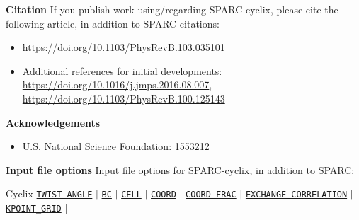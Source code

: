 \begin{frame}[allowframebreaks]{\textbf{Citation}} \label{Citation}
If you publish work using/regarding SPARC-cyclix, please cite the following article, in addition to SPARC citations:
\begin{itemize}
    \item \url{https://doi.org/10.1103/PhysRevB.103.035101}
    \item Additional references for initial developments: \url{https://doi.org/10.1016/j.jmps.2016.08.007}, \url{https://doi.org/10.1103/PhysRevB.100.125143}
\end{itemize}
\end{frame}


\begin{frame}[allowframebreaks]{\textbf{Acknowledgements}} \label{Acknowledgements}
\begin{itemize}
    \item U.S. National Science Foundation: 1553212
\end{itemize}
\end{frame}


\begin{frame}[allowframebreaks]{\textbf{Input file options}} \label{Index}
\vspace{-2mm}
Input file options for SPARC-cyclix, in addition to SPARC:
 \begin{block}{Cyclix}
\hyperlink{TWIST_ANGLE}{\texttt{TWIST\_ANGLE}} $\vert$ 
\hyperlink{BC}{\texttt{BC}} $\vert$ 
\hyperlink{CELL}{\texttt{CELL}}  $\vert$ 
\hyperlink{COORD}{\texttt{COORD}}  $\vert$ 
\hyperlink{COORD_FRAC}{\texttt{COORD\_FRAC}}  $\vert$ 
\hyperlink{EXCHANGE_CORRELATION}{\texttt{EXCHANGE\_CORRELATION}} $\vert$ 
\hyperlink{KPOINT_GRID}{\texttt{KPOINT\_GRID}} $\vert$ 

\end{block}
\end{frame}








